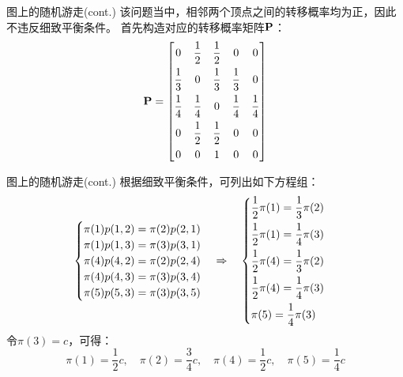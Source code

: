 \documentclass[t]{beamer}
\begin{document}
\begin{frame}{图上的随机游走(cont.)}
    该问题当中，相邻两个顶点之间的转移概率均为正，因此不违反细致平衡条件。
    首先构造对应的转移概率矩阵$\bf P$：
    \[{\bf P}=	
            \begin{bmatrix}
    \vspace{1ex}0  &      \dfrac{1}{2} &       \dfrac{1}{2} &        0&        0  \\
    \vspace{1ex}
    \dfrac{1}{3}  &       0 &        \dfrac{1}{3} &      \dfrac{1}{3}&        0  \\
    \vspace{1ex}\dfrac{1}{4}  &     \dfrac{1}{4} &        0 &        \dfrac{1}{4} &       \dfrac{1}{4}   \\
    \vspace{1ex}0  &     \dfrac{1}{2}  &       \dfrac{1}{2}  &        0 &        0 \\
    0  &       0 &       1 &        0 &        0 \\
            \end{bmatrix}\]
        \end{frame}
        
        \begin{frame}{图上的随机游走(cont.)}
            \small
    根据细致平衡条件，可列出如下方程组：
    \[\begin{cases}
    \pi(1)p(1,2)=\pi(2)p(2,1)\\
    \pi(1)p(1,3)=\pi(3)p(3,1)\\
    \pi(4)p(4,2)=\pi(2)p(2,4)\\
    \pi(4)p(4,3)=\pi(3)p(3,4)\\
    
    \pi(5)p(5,3)=\pi(3)p(3,5)\\
    \end{cases}\Rightarrow\quad  \begin{cases}
     \vspace{1ex} \dfrac{1}{2}\pi(1)=\dfrac{1}{3}\pi(2)\\  \vspace{1ex} 
    \dfrac{1}{2}\pi(1)=\dfrac{1}{4}\pi(3)\\  \vspace{1ex} 
    \dfrac{1}{2}\pi(4)=\dfrac{1}{3}\pi(2)\\  \vspace{1ex} 
    \dfrac{1}{2}\pi(4)=\dfrac{1}{4}\pi(3)\\ 
    \pi(5)=\dfrac{1}{4}\pi(3)\\
    \end{cases}\]
    令$\pi(3)=c$，可得：
    \[\pi(1)=\dfrac{1}{2}c,\quad \pi(2)=\dfrac{3}{4}c,\quad \pi(4)=\dfrac{1}{2}c,\quad \pi(5)=\dfrac{1}{4}c\]       \end{frame}
        
\end{document}
